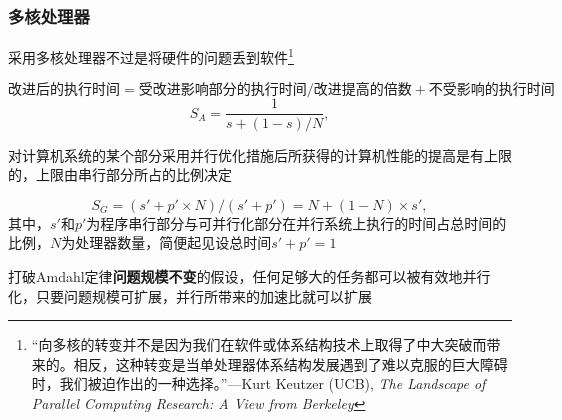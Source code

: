 \subsubsection{多核处理器}
采用多核处理器不过是将硬件的问题丢到软件\footnote{“向多核的转变并不是因为我们在软件或体系结构技术上取得了中大突破而带来的。相反，这种转变是当单处理器体系结构发展遇到了难以克服的巨大障碍时，我们被迫作出的一种选择。”---Kurt Keutzer (UCB), \emph{The Landscape of Parallel Computing Research: A View from Berkeley}}
\begin{theorem}
\label{thm:amdahl}
\[\text{改进后的执行时间}=\text{受改进影响部分的执行时间}/\text{改进提高的倍数}+\text{不受影响的执行时间}\]
\[S_A=\frac{1}{s+(1-s)/N},\]
\end{theorem}
对计算机系统的某个部分采用并行优化措施后所获得的计算机性能的提高是有上限的，上限由串行部分所占的比例决定
\begin{theorem}
\[S_G=(s'+p'\times N)/(s'+p')=N+(1-N)\times s',\]
其中，$s'$和$p'$为程序串行部分与可并行化部分在并行系统上执行的时间占总时间的比例，$N$为处理器数量，简便起见设总时间$s'+p'=1$
\end{theorem}
打破Amdahl定律\textbf{问题规模不变}的假设，任何足够大的任务都可以被有效地并行化，只要问题规模可扩展，并行所带来的加速比就可以扩展
